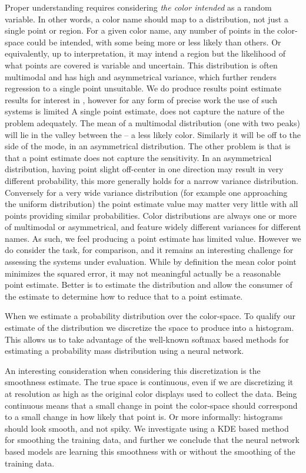 \documentclass[11pt,a4paper]{article}
\begin{document}
Proper understanding requires considering \emph{the color intended} as a random variable.
In other words, a color name should map to a distribution, not just a single point or region.
For a given color name, any number of points in the color-space could be intended, with some being more or less likely than others.
Or equivalently, up to interpretation, it may intend a region but the likelihood of what points are covered is variable and uncertain.
This distribution is often multimodal and has high and asymmetrical variance, which further renders regression to a single point unsuitable.
We do produce results point estimate results for interest in , however for any form of precise work the use of such systems is limited
A single point estimate, does not capture the nature of the problem adequately.
The mean of a multimodal distribution (one with two peaks) will lie in the valley between the -- a less likely color.
Similarly it will be off to the side of the mode, in an asymmetrical distribution.
The other problem is that is that a point estimate does not capture the sensitivity.
In an asymmetrical distribution, having  point slight off-center in one direction may result in very different probability,
this more generally holds for a narrow variance distribution.
Conversely for a very wide variance distribution (for example one approaching the uniform distribution) the point estimate value may matter very little with all points providing similar probabilities.
Color distributions are always one or more of multimodal or asymmetrical, and feature widely different variances for different names.
As such, we feel producing a point estimate has limited value.
However we do consider the task, for comparison, and it remains an interesting challenge for assessing the systems under evaluation.
While by definition the mean color point minimizes the squared error, it may not meaningful actually be a reasonable point estimate.
Better is to estimate the distribution and allow the consumer of the estimate to determine how to reduce that to a point estimate.


When we estimate a probability distribution over the color-space.
To qualify our estimate of the distribution we discretize the space to produce into a histogram.
This allows us to take advantage of the well-known softmax based methods for estimating a probability mass distribution using a neural network.

An interesting consideration when considering this discretization is the smoothness estimate.
The true space is continuous, even if we are discretizing it at resolution as high as the original color displays used to collect the data.
Being continuous means that a small change in point the color-space should correspond to a small change in how likely that point is.
Or more informally: histograms should look smooth, and not spiky.
We investigate using a KDE based method for smoothing the training data, and further we conclude that the neural network based models are learning this smoothness with or without the smoothing of the training data.
\end{document}
